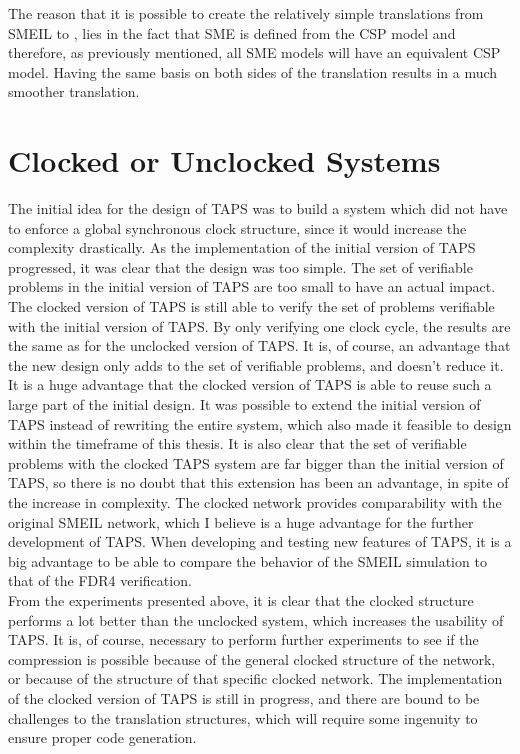 The reason that it is possible to create the relatively simple translations from SMEIL to \cspm{}, lies in the fact that SME is defined from the CSP model and therefore, as previously mentioned, all SME models will have an equivalent CSP model. Having the same basis on both sides of the translation results in a much smoother translation.
\section{Clocked or Unclocked \cspm{} Systems}
The initial idea for the design of TAPS was to build a system which did not have to enforce a global synchronous clock structure, since it would increase the complexity drastically. As the implementation of the initial version of TAPS progressed, it was clear that the design was too simple. The set of verifiable problems in the initial version of TAPS are too small to have an actual impact.
The clocked version of TAPS is still able to verify the set of problems verifiable with the initial version of TAPS. By only verifying one clock cycle, the results are the same as for the unclocked version of TAPS.
It is, of course, an advantage that the new design only adds to the set of verifiable problems, and doesn't reduce it.\\

It is a huge advantage that the clocked version of TAPS is able to reuse such a large part of the initial design. It was possible to extend the initial version of TAPS instead of rewriting the entire system, which also made it feasible to design within the timeframe of this thesis.
It is also clear that the set of verifiable problems with the clocked TAPS system are far bigger than the initial version of TAPS, so there is no doubt that this extension has been an advantage, in spite of the increase in complexity.
The clocked \cspm{} network provides comparability with the original SMEIL network, which I believe is a huge advantage for the further development of TAPS. When developing and testing new features of TAPS, it is a big advantage to be able to compare the behavior of the SMEIL simulation to that of the FDR4 verification. \\

From the experiments presented above, it is clear that the clocked structure performs a lot better than the unclocked system, which increases the usability of TAPS. It is, of course, necessary to perform further experiments to see if the compression is possible because of the general clocked structure of the network, or because of the structure of that specific clocked network.
The implementation of the clocked version of TAPS is still in progress, and there are bound to be challenges to the translation structures, which will require some ingenuity to ensure proper code generation.
